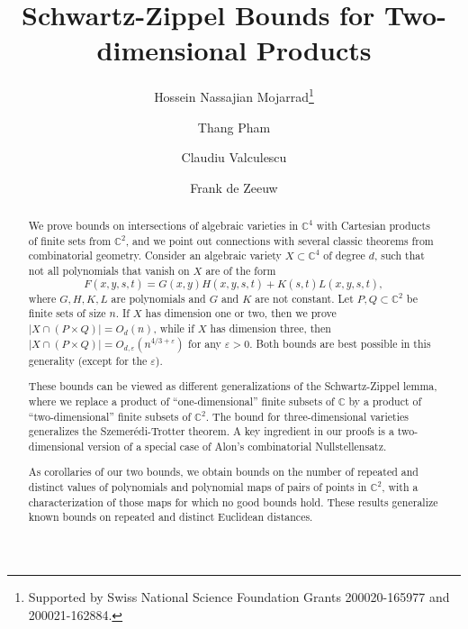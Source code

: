\documentclass{daj}
\theoremstyle{definition}
\newcommand{\C}{\mathbb C}
\newcommand{\eps}{\varepsilon}
\begin{document}
\begin{frontmatter}[classification=text]

\title{Schwartz-Zippel Bounds for Two-dimensional Products
} 

\author[hnm]{Hossein Nassajian Mojarrad\thanks{Supported by Swiss National Science Foundation Grants 200020-165977 and 200021-162884.}}
\author[tp]{Thang Pham\footnotemark[1]}
\author[cv]{Claudiu Valculescu\footnotemark[1]}
\author[fdz]{Frank de Zeeuw\footnotemark[1]}

\begin{abstract}
We prove bounds on intersections of algebraic varieties in $\C^4$ with Cartesian products of finite sets from $\C^2$, and we point out connections with several classic theorems from combinatorial geometry.
Consider an algebraic variety $X\subset \C^4$ of degree $d$, 
such that not all polynomials that vanish on $X$ are of the form
\[ F(x,y,s,t) = G(x,y)H(x,y,s,t) + K(s,t)L(x,y,s,t),\]
where $G,H,K,L$ are polynomials and $G$ and $K$ are not constant.
Let $P,Q\subset \C^2$ be finite sets of size $n$.
If $X$ has dimension one or two, then we prove $|X\cap (P\times Q)| = O_d(n)$, while if $X$ has dimension three, then $|X\cap (P\times Q)| =O_{d,\eps}(n^{4/3+\eps})$ for any $\eps>0$.
Both bounds are best possible in this generality (except for the $\eps$).

These bounds can be viewed as different generalizations of the Schwartz-Zippel lemma, where we replace a product of ``one-dimensional'' finite subsets of $\C$ by a product of ``two-dimensional'' finite subsets of $\C^2$.
The bound for three-dimensional varieties generalizes the Szemer\'edi-Trotter theorem.
A key ingredient in our proofs is a two-dimensional version of a special case of Alon's combinatorial Nullstellensatz.

As corollaries of our two bounds,
we obtain bounds on the number of repeated and distinct values of polynomials and polynomial maps of pairs of points in $\C^2$, with a characterization of those maps for which no good bounds hold.
These results generalize known bounds on repeated and distinct Euclidean distances.
\end{abstract}
\end{frontmatter}
\end{document}

